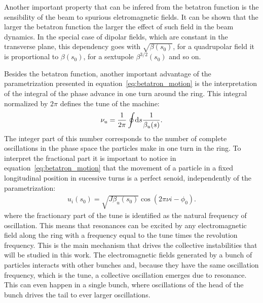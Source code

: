 	Another important property that can be infered from the betatron function is the sensibility of the beam to spurious eletromagnetic fields. It can be shown that the larger the betatron function the larger the effect of such field in the beam dynamics. In the special case of dipolar fields, which are constant in the transverse plane, this dependency goes with $\sqrt{\beta(s_0)}$, for a quadrupolar field it is proportional to $\beta(s_0)$, for a sextupole $\beta^{3/2}(s_0)$ and so on.

	Besides the betatron function, another important advantage of the parametrization presented in equation~\eqref{eq:betatron_motion} is the interpretation of the integral of the phase advance in one turn around the ring. This integral normalized by $2\pi$ defines the tune of the machine:
	\begin{align}
		\nu_u = \frac{1}{2\pi}\oint\!\text{d}s \frac{1}{\beta_u(s)}.
	\end{align}
	The integer part of this number corresponds to the number of complete oscillations in the phase space the particles make in one turn in the ring. To interpret the fractional part it is important to notice in equation~\eqref{eq:betatron_motion} that the movement of a particle in a fixed longitudinal position in sucessive turns is a perfect senoid, independently of the parametrization:
	\begin{align}
		u_i(s_0) = \sqrt{J\beta_u(s_0)}\cos(2\pi\nu i -\phi_0).
	\end{align}
	where the fractionary part of the tune is identified as the natural frequency of oscillation. This means that resonances can be excited by any electromagnetic field along the ring with a frequency equal to the tune times the revolution frequency. This is the main mechanism that drives the collective instabilities that will be studied in this work. The electromagnetic fields generated by a bunch of particles interacts with other bunches and, because they have the same oscillation frequency, which is the tune, a collective oscillation emerges due to resonance. This can even happen in a single bunch, where oscillations of the head of the bunch drives the tail to ever larger oscillations.

